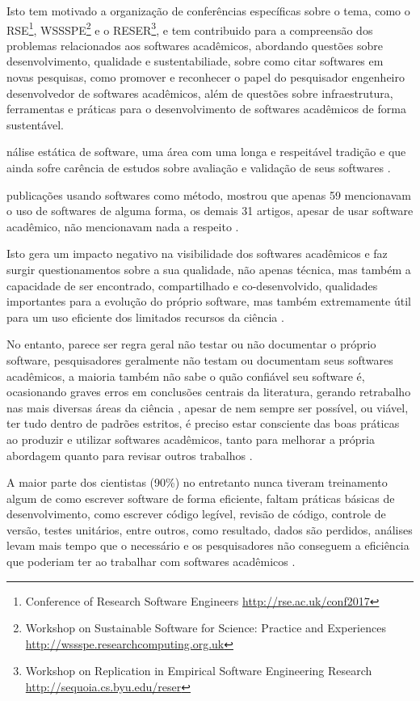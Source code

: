 Isto tem motivado a organização de conferências específicas sobre o tema, como
o RSE\footnote{Conference of Research Software Engineers
\url{http://rse.ac.uk/conf2017}}, WSSSPE\footnote{Workshop on Sustainable
Software for Science: Practice and Experiences
\url{http://wssspe.researchcomputing.org.uk}} e o RESER\footnote{Workshop on
Replication in Empirical Software Engineering Research
\url{http://sequoia.cs.byu.edu/reser}}, e tem contribuido para a compreensão
dos problemas relacionados aos softwares acadêmicos, abordando questões sobre
desenvolvimento, qualidade e sustentabiliade, sobre como citar softwares em
novas pesquisas, como promover e reconhecer o papel do pesquisador engenheiro
desenvolvedor de softwares acadêmicos, além de questões sobre infraestrutura,
ferramentas e práticas para o desenvolvimento de softwares acadêmicos de
forma sustentável.

nálise estática de software, uma área com uma longa e respeitável
tradição e que ainda sofre carência de estudos sobre avaliação e validação de
seus softwares \cite{li2010comparative, ilyas2016static}.

publicações usando softwares como método, mostrou que apenas 59 mencionavam o
uso de softwares de alguma forma, os demais 31 artigos, apesar de usar software
acadêmico, não mencionavam nada a respeito \cite{howison2016software}.

Isto gera um impacto negativo na visibilidade dos softwares acadêmicos e faz
surgir questionamentos sobre a sua qualidade, não apenas técnica, mas também a
capacidade de ser encontrado, compartilhado e co-desenvolvido, qualidades
importantes para a evolução do próprio software, mas também extremamente útil
para um uso eficiente dos limitados recursos da ciência \cite{howison2013incentives,
katz2014transitive}.

No entanto, parece ser regra geral não testar ou não documentar o próprio
software, pesquisadores geralmente não testam ou documentam seus softwares
acadêmicos, a maioria também não sabe o quão confiável seu software é,
ocasionando graves erros em conclusões centrais da literatura,
gerando retrabalho nas mais diversas áreas da ciência \cite{merali2010computational},
apesar de nem sempre ser possível, ou viável, ter tudo dentro de
padrões estritos, é preciso estar consciente das boas práticas ao
produzir e utilizar softwares acadêmicos, tanto para melhorar a própria
abordagem quanto para revisar outros trabalhos \cite{wilson2014best}.

A maior parte dos cientistas (90\%) no entretanto nunca tiveram treinamento
algum de como escrever software de forma eficiente, faltam práticas básicas de
desenvolvimento, como escrever código legível, revisão de código, controle de
versão, testes unitários, entre outros, como resultado, dados são perdidos,
análises levam mais tempo que o necessário e os pesquisadores não conseguem a
eficiência que poderiam ter ao trabalhar com softwares acadêmicos
\cite{wilson2017good}.

